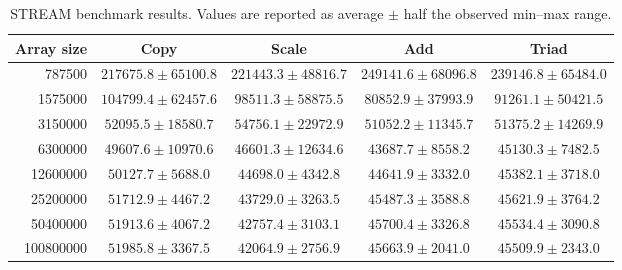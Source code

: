 \begin{table}[ht]
    \centering
    \caption{STREAM benchmark results. Values are reported as average $\pm$ half the observed min--max range.}
    \label{tab:stream-results}
    \begin{tabular}{rcccc}
        \hline
        Array size & Copy & Scale & Add & Triad \\
        \hline
        787500 & $217675.8 \pm 65100.8$ & $221443.3 \pm 48816.7$ & $249141.6 \pm 68096.8$ & $239146.8 \pm 65484.0$ \\
        1575000 & $104799.4 \pm 62457.6$ & $98511.3 \pm 58875.5$ & $80852.9 \pm 37993.9$ & $91261.1 \pm 50421.5$ \\
        3150000 & $52095.5 \pm 18580.7$ & $54756.1 \pm 22972.9$ & $51052.2 \pm 11345.7$ & $51375.2 \pm 14269.9$ \\
        6300000 & $49607.6 \pm 10970.6$ & $46601.3 \pm 12634.6$ & $43687.7 \pm 8558.2$ & $45130.3 \pm 7482.5$ \\
        12600000 & $50127.7 \pm 5688.0$ & $44698.0 \pm 4342.8$ & $44641.9 \pm 3332.0$ & $45382.1 \pm 3718.0$ \\
        25200000 & $51712.9 \pm 4467.2$ & $43729.0 \pm 3263.5$ & $45487.3 \pm 3588.8$ & $45621.9 \pm 3764.2$ \\
        50400000 & $51913.6 \pm 4067.2$ & $42757.4 \pm 3103.1$ & $45700.4 \pm 3326.8$ & $45534.4 \pm 3090.8$ \\
        100800000 & $51985.8 \pm 3367.5$ & $42064.9 \pm 2756.9$ & $45663.9 \pm 2041.0$ & $45509.9 \pm 2343.0$ \\
        \hline
    \end{tabular}
\end{table}
